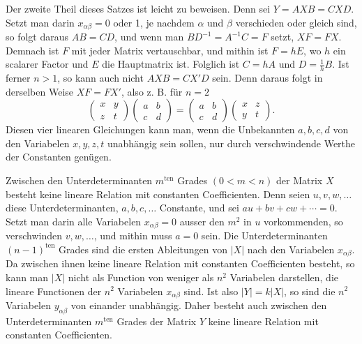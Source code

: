 \documentclass[11pt]{article}
\newcommand{\ten}{\mathrm{ten}}
\begin{document}
Der zweite Theil dieses Satzes ist leicht zu beweisen. Denn sei $Y=AXB=CXD$. Setzt man darin $x_{\alpha\beta}=0$ oder 1, je nachdem $\alpha$ und $\beta$ verschieden oder gleich sind, so folgt daraus $AB=CD$, und wenn man $BD^{-1}=A^{-1}C=F$ setzt, $XF=FX$. Demnach ist $F$ mit jeder Matrix vertauschbar, und mithin ist $F=hE$, wo $h$ ein scalarer Factor und $E$ die Hauptmatrix ist. Folglich ist $C=hA$ und $D=\frac{1}{h}B$. Ist ferner $n>1$, so kann auch nicht $AXB=CX'D$ sein. Denn daraus folgt in derselben Weise $XF=FX'$, also z. B. für $n=2$
\[
\begin{pmatrix}x&y\\z&t\end{pmatrix}
\begin{pmatrix}a&b\\c&d\end{pmatrix}
=\begin{pmatrix}a&b\\c&d\end{pmatrix}
\begin{pmatrix}x&z\\y&t\end{pmatrix}.
\]
Diesen vier linearen Gleichungen kann man, wenn die Unbekannten $a,b,c,d$ von den Variabelen $x,y,z,t$ unabhängig sein sollen, nur durch verschwindende Werthe der Constanten genügen.

Zwischen den Unterdeterminanten $m^{\ten}$ Grades $(0<m<n)$ der Matrix $X$ besteht keine lineare Relation mit constanten Coefficienten. Denn seien $u,v,w,\ldots$ diese Unterdeterminanten, $a,b,c,\ldots$ Constante, und sei $au+bv+cw+\cdots=0$. Setzt man darin alle Variabelen $x_{\alpha\beta}=0$ ausser den $m^2$ in $u$ vorkommenden, so verschwinden $v,w,\ldots$, und mithin muss $a=0$ sein. Die Unterdeterminanten $(n-1)^{\ten}$ Grades sind die ersten Ableitungen von $|X|$ nach den Variabelen $x_{\alpha\beta}$. Da zwischen ihnen keine lineare Relation mit constanten Coefficienten besteht, so kann man $|X|$ nicht als Function von weniger als $n^2$ Variabelen darstellen, die lineare Functionen der $n^2$ Variabelen $x_{\alpha\beta}$ sind. Ist also $|Y|=k|X|$, so sind die $n^2$ Variabelen $y_{\alpha\beta}$ von einander unabhängig. Daher besteht auch zwischen den Unterdeterminanten $m^{\ten}$ Grades der Matrix $Y$ keine lineare Relation mit constanten Coefficienten.
\end{document}
